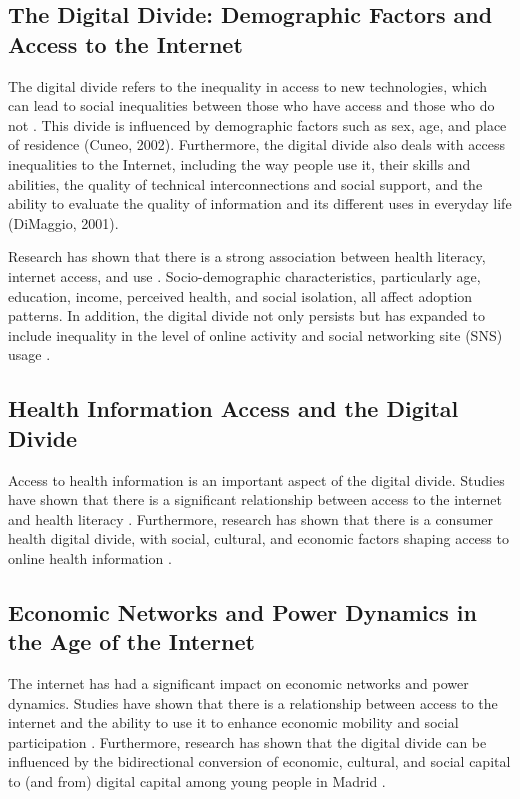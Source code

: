 \documentclass{article}
\begin{document}
\subsection{The Digital Divide: Demographic Factors and Access to the Internet}

The digital divide refers to the inequality in access to new technologies, which can lead to social inequalities between those who have access and those who do not \cite{Koletsi2009BridgingTS}. This divide is influenced by demographic factors such as sex, age, and place of residence (Cuneo, 2002). Furthermore, the digital divide also deals with access inequalities to the Internet, including the way people use it, their skills and abilities, the quality of technical interconnections and social support, and the ability to evaluate the quality of information and its different uses in everyday life (DiMaggio, 2001).

Research has shown that there is a strong association between health literacy, internet access, and use \cite{Estacio2019TheDD}. Socio-demographic characteristics, particularly age, education, income, perceived health, and social isolation, all affect adoption patterns. In addition, the digital divide not only persists but has expanded to include inequality in the level of online activity and social networking site (SNS) usage \cite{Haight2014RevisitingTD}.

\subsection{Health Information Access and the Digital Divide}

Access to health information is an important aspect of the digital divide. Studies have shown that there is a significant relationship between access to the internet and health literacy \cite{Haight2014RevisitingTD}. Furthermore, research has shown that there is a consumer health digital divide, with social, cultural, and economic factors shaping access to online health information \cite{Chong2006ConsumerHD}.

\subsection{Economic Networks and Power Dynamics in the Age of the Internet}

The internet has had a significant impact on economic networks and power dynamics. Studies have shown that there is a relationship between access to the internet and the ability to use it to enhance economic mobility and social participation \cite{Estacio2019TheDD}. Furthermore, research has shown that the digital divide can be influenced by the bidirectional conversion of economic, cultural, and social capital to (and from) digital capital among young people in Madrid \cite{Gmez2020TheTD}.
\end{document}
